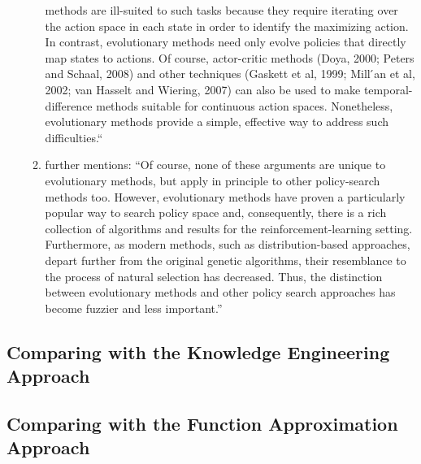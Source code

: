 \begin{itemize}
\begin{enumerate}
					methods are ill-suited to such tasks because they require iterating over the action
					space in each state in order to identify the maximizing action. In contrast,
					evolutionary methods need only evolve policies that directly map states to actions. Of
					course, actor-critic methods (Doya, 2000; Peters and Schaal, 2008) and other techniques
					(Gaskett et al, 1999; Mill ́an et al, 2002; van Hasselt and Wiering, 2007) can
					also be used to make temporal-difference methods suitable for continuous action
					spaces. Nonetheless, evolutionary methods provide a simple, effective way to
					address such difficulties.``
				\item \citet{Whiteson2012} further mentions: ``Of course, none
					of these arguments are unique to evolutionary methods, but
					apply in principle to other policy-search methods too.
					However, evolutionary methods have proven a particularly
					popular way to search policy space and, consequently, there
					is a rich collection of algorithms and results for the
					reinforcement-learning setting. Furthermore, as modern
					methods, such as distribution-based approaches, depart
					further from the original genetic algorithms, their
					resemblance to the process of natural selection has
					decreased. Thus, the distinction between evolutionary
					methods and other policy search approaches has become
					fuzzier and less important.''
		  \end{enumerate}
\end{itemize}
\subsection{Comparing with the Knowledge Engineering Approach}
\subsection{Comparing with the Function Approximation Approach}
